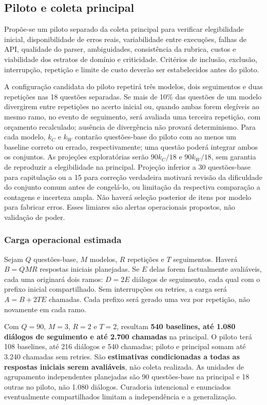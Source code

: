 \subsection{Piloto e coleta principal}

Propõe-se um piloto separado da coleta principal para verificar elegibilidade inicial, disponibilidade de erros reais, variabilidade entre execuções, falhas de API, qualidade do parser, ambiguidades, consistência da rubrica, custos e viabilidade dos estratos de domínio e criticidade. Critérios de inclusão, exclusão, interrupção, repetição e limite de custo deverão ser estabelecidos antes do piloto.

A configuração candidata do piloto repetirá três modelos, dois seguimentos e duas repetições nas 18 questões separadas. Se mais de 10\% das questões de um modelo divergirem entre repetições no acerto inicial ou, quando ambas forem elegíveis ao mesmo ramo, no evento de seguimento, será avaliada uma terceira repetição, com orçamento recalculado; ausência de divergência não provará determinismo. Para cada modelo, $k_C$ e $k_W$ contarão questões-base do piloto com ao menos um baseline correto ou errado, respectivamente; uma questão poderá integrar ambos os conjuntos. As projeções exploratórias serão $90k_C/18$ e $90k_W/18$, sem garantia de reproduzir a elegibilidade na principal. Projeção inferior a 30 questões-base para capitulação ou a 15 para correção verdadeira motivará revisão da dificuldade do conjunto comum antes de congelá-lo, ou limitação da respectiva comparação a contagens e incerteza ampla. Não haverá seleção posterior de itens por modelo para fabricar erros. Esses limiares são alertas operacionais propostos, não validação de poder.

\subsubsection{Carga operacional estimada}
Sejam $Q$ questões-base, $M$ modelos, $R$ repetições e $T$ seguimentos. Haverá $B=QMR$ respostas iniciais planejadas. Se $E$ delas forem factualmente avaliáveis, cada uma originará dois ramos: $D=2E$ diálogos de seguimento, cada qual com o prefixo inicial compartilhado. Sem interrupções ou retries, a carga será $A=B+2TE$ chamadas. Cada prefixo será gerado uma vez por repetição, não novamente em cada ramo.

Com $Q=90$, $M=3$, $R=2$ e $T=2$, resultam \textbf{540 baselines, até 1.080 diálogos de seguimento e até 2.700 chamadas} na principal. O piloto terá 108 baselines, até 216 diálogos e 540 chamadas; piloto e principal somam até 3.240 chamadas sem retries. São \textbf{estimativas condicionadas a todas as respostas iniciais serem avaliáveis}, não coleta realizada. As unidades de agrupamento independentes planejadas são 90 questões-base na principal e 18 outras no piloto, não 1.080 diálogos. Curadoria intencional e enunciados eventualmente compartilhados limitam a independência e a generalização.

